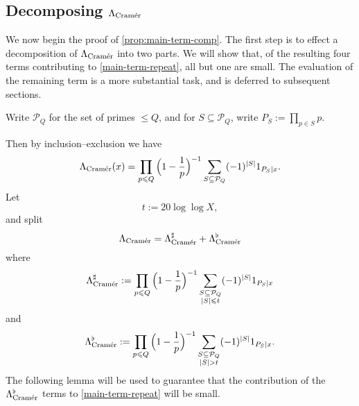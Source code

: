 \documentclass[11pt,reqno]{amsart}
\numberwithin{equation}{section}
\theoremstyle{definition}
\theoremstyle{remark}
\newcommand{\mc}{\mathcal}
\renewcommand{\le}{\leqslant}
\newcommand\cramer{{\textnormal{Cram\'er}}}
\begin{document}
\subsection{Decomposing \texorpdfstring{$\Lambda_{\cramer}$}{}}
We now begin the proof of \cref{prop:main-term-comp}. The first step is to effect a decomposition of $\Lambda_{\cramer}$ into two parts. We will show that, of the resulting four terms contributing to \cref{main-term-repeat}, all but one are small. The evaluation of the remaining term is a more substantial task, and is deferred to subsequent sections.

Write $\mc{P}_Q$ for the set of primes $\le Q$, and for $S \subseteq \mc{P}_Q$, write $P_S := \prod_{p \in S} p$.

Then by inclusion--exclusion we have
\[ \Lambda_{\cramer}(x) = \prod_{p \le Q} \Big(1 - \frac{1}{p}\Big)^{-1} \sum_{S \subseteq \mc{P}_Q} (-1)^{|S|} 1_{P_S | x}. \]
 Let \begin{equation}\label{t-choice} t := 20\log \log X,\end{equation} and split
\begin{equation}\label{cramer-split} \Lambda_{\cramer} = \Lambda_{\cramer}^{\sharp} + \Lambda_{\cramer}^{\flat}\end{equation} where
\begin{equation}\label{lam-sharp-def}
  \Lambda_{\cramer}^{\sharp} := \prod_{p \le Q} \Big(1 - \frac{1}{p}\Big)^{-1} \sum_{\substack{S \subseteq \mc{P}_Q \\ |S| \le t}} (-1)^{|S|} 1_{P_S | x}   
\end{equation} and
\begin{equation}\label{lam-flat-def} \Lambda_{\cramer}^{\flat} := \prod_{p \le Q} \Big(1 - \frac{1}{p}\Big)^{-1} \sum_{\substack{S \subseteq \mc{P}_Q \\ |S| > t}} (-1)^{|S|} 1_{P_S | x}.\end{equation}
The following lemma will be used to guarantee that the contribution of the $\Lambda_{\cramer}^{\flat}$ terms to \cref{main-term-repeat} will be small.
\end{document}
